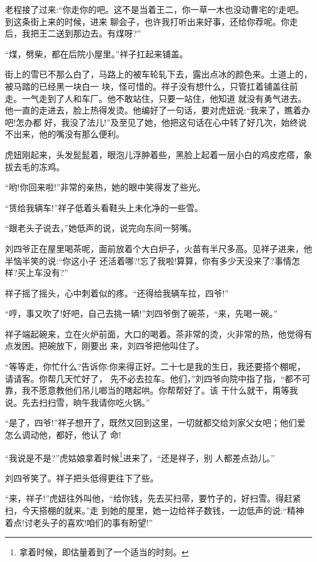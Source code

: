 \documentclass[11pt,a4paper,onecolumn]{article}
\begin{document}
老程接了过来:``你走你的吧。这不是当着王二，你一草一木也没动曹宅的!走吧。到这条街上来的时候，进来
聊会子，也许我打听出来好事，还给你荐呢。你走后，我把王二送到那边去。有煤呀?''

``煤，劈柴，都在后院小屋里。''祥子扛起来铺盖。

街上的雪已不那么白了，马路上的被车轮轧下去，露出点冰的颜色来。土道上的，被马踏的已经黑一块白一
块，怪可惜的。祥子没有想什么，只管扛着铺盖往前走。一气走到了人和车厂。他不敢站住，只要一站住，他知道
就没有勇气进去。他一直的走进去，脸上热得发烫。他编好了一句话，要对虎妞说:``我来了，瞧着办吧!怎办都
好，我没了法儿!''及至见了她，他把这句话在心中转了好几次，始终说不出来，他的嘴没有那么便利。

虎妞刚起来，头发髭髭着，眼泡儿浮肿着些，黑脸上起着一层小白的鸡皮疙瘩，象拔去毛的冻鸡。

``哟!你回来啦!''非常的亲热，她的眼中笑得发了些光。

``赁给我辆车!''祥子低着头看鞋头上未化净的一些雪。

``跟老头子说去，''她低声的说，说完向东间一努嘴。

刘四爷正在屋里喝茶呢，面前放着个大白炉子，火苗有半尺多高。见祥子进来，他半恼半笑的说:``你这小子
还活着哪?!忘了我啦!算算，你有多少天没来了?事情怎样?买上车没有?''

祥子摇了摇头，心中刺着似的疼。``还得给我辆车拉，四爷!''

``哼，事又吹了!好吧，自己去挑一辆!''刘四爷倒了碗茶，``来，先喝一碗。''

祥子端起碗来，立在火炉前面，大口的喝着。茶非常的烫，火非常的热，他觉得有点发困。把碗放下，刚要出
来，刘四爷把他叫住了。

``等等走，你忙什么?告诉你:你来得正好。二十七是我的生日，我还要搭个棚呢，请请客。你帮几天忙好了，
先不必去拉车。他们，''刘四爷向院中指了指，``都不可靠，我不愿意教他们吊儿啷当的瞎起哄。你帮帮好了。该
干什么就干，甭等我说。先去扫扫雪，晌午我请你吃火锅。''

``是了，四爷!''祥子想开了，既然又回到这里，一切就都交给刘家父女吧；他们爱怎么调动他，都好，他认了
命!

``我说是不是?''虎姑娘拿着时候\footnote{拿着时候，即估量着到了一个适当的时刻。}进来了，``还是祥子，别
人都差点劲儿。''

刘四爷笑了。祥子把头低得更往下了些。

``来，祥子!''虎妞往外叫他，``给你钱，先去买扫帚，要竹子的，好扫雪。得赶紧扫，今天搭棚的就来。''走
到她的屋里，她一边给祥子数钱，一边低声的说:``精神着点!讨老头子的喜欢!咱们的事有盼望!''
\end{document}
